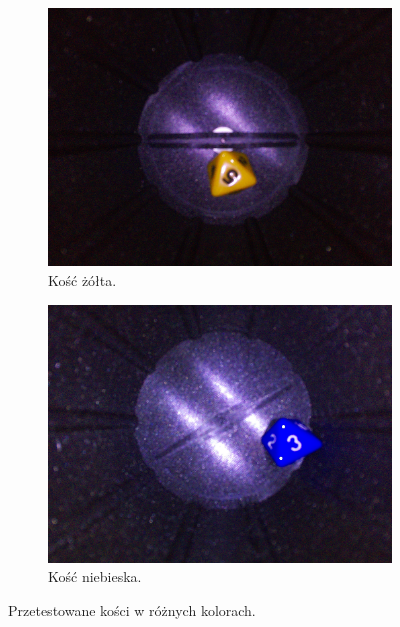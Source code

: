 \begin{figure}[H]
    \hfill
    \begin{subfigure}{0.32\textwidth}
        \centering
        \includegraphics[width=\linewidth]{chapters/03-praca-wlasna/figures/kolorki/zolte.jpg}
        \caption{\label{fig:yellow}Kość żółta.}
    \end{subfigure}
    \hfill
    \begin{subfigure}{0.32\textwidth}
        \centering
        \includegraphics[width=\linewidth]{chapters/03-praca-wlasna/figures/kolorki/niebieska.jpg}
        \caption{\label{fig:blue}Kość niebieska.}
    \end{subfigure}
    \caption{\label{fig:kostki}Przetestowane kości w różnych kolorach.}
\end{figure}

